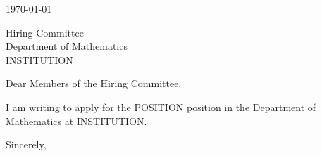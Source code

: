 \documentclass[11pt]{article}
\newcommand{\position}{POSITION}
\newcommand{\institution}{INSTITUTION}
\newcommand{\department}{Department of Mathematics}
\newcommand{\recipient}{Hiring Committee}
\begin{document}

\today

\medskip
\noindent \recipient\\
\department\\
\institution

\bigskip
\noindent Dear Members of the \recipient,

I am writing to apply for the \position{} position in the \department{} at
\institution.


Sincerely,

\medskip
\myname
\end{document}
